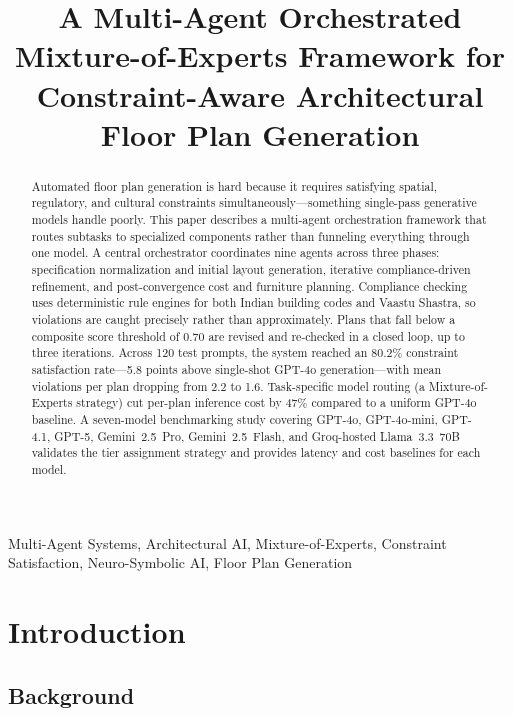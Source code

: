 \documentclass[journal]{IEEEtran}
\title{A Multi-Agent Orchestrated Mixture-of-Experts Framework for
Constraint-Aware Architectural Floor Plan Generation}
\author{%
    \IEEEauthorblockN{Saqlain Ahmed P}
    \IEEEauthorblockA{saqlainahmed302@gmail.com}
    \and
    \IEEEauthorblockN{Mohammed Nouman L}
    \IEEEauthorblockA{mohammednouman604@gmail.com}
    \and
    \IEEEauthorblockN{Naveen Zille}
    \IEEEauthorblockA{naveenzille007@gmail.com}
    \and
    \IEEEauthorblockN{Darshan Naidu}
    \IEEEauthorblockA{darshannaiduj@gmail.com}
}
\begin{document}
\maketitle

\begin{abstract}
Automated floor plan generation is hard because it requires satisfying
spatial, regulatory, and cultural constraints simultaneously---something
single-pass generative models handle poorly. This paper describes a
multi-agent orchestration framework that routes subtasks to specialized
components rather than funneling everything through one model. A central
orchestrator coordinates nine agents across three phases: specification
normalization and initial layout generation, iterative compliance-driven
refinement, and post-convergence cost and furniture planning. Compliance
checking uses deterministic rule engines for both Indian building codes and
Vaastu Shastra, so violations are caught precisely rather than approximately.
Plans that fall below a composite score threshold of 0.70 are revised and
re-checked in a closed loop, up to three iterations. Across 120 test prompts,
the system reached an 80.2\% constraint satisfaction rate---5.8 points above
single-shot GPT-4o generation---with mean violations per plan dropping from
2.2 to 1.6. Task-specific model routing (a Mixture-of-Experts strategy) cut
per-plan inference cost by 47\% compared to a uniform GPT-4o baseline.
A seven-model benchmarking study covering GPT-4o, GPT-4o-mini, GPT-4.1,
GPT-5, Gemini~2.5~Pro, Gemini~2.5~Flash, and Groq-hosted Llama~3.3~70B
validates the tier assignment strategy and provides latency and cost baselines
for each model.
\end{abstract}

\begin{IEEEkeywords}
Multi-Agent Systems, Architectural AI, Mixture-of-Experts, Constraint
Satisfaction, Neuro-Symbolic AI, Floor Plan Generation
\end{IEEEkeywords}

\section{Introduction}

\subsection{Background}
\end{document}
